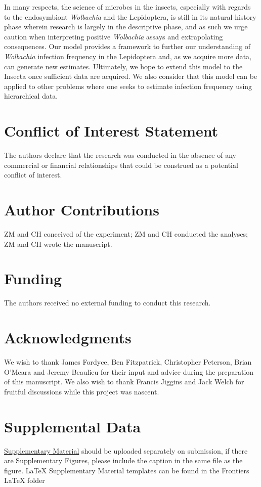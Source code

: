 \documentclass{frontiersSCNS}
\begin{document}
In many respects, the science of microbes in the insects, especially with regards to the endosymbiont \textit{Wolbachia} and the Lepidoptera, is still in its natural history phase wherein research is largely in the descriptive phase, and as such we urge caution when interpreting positive \textit{Wolbachia} assays and extrapolating consequences. Our model provides a framework to further our understanding of \textit{Wolbachia} infection frequency in the Lepidoptera and, as we acquire more data, can generate new estimates. Ultimately, we hope to extend this model to the Insecta once sufficient data are acquired. We also consider that this model can be applied to other problems where one seeks to estimate infection frequency using hierarchical data. 


\newpage

\section*{Conflict of Interest Statement}
The authors declare that the research was conducted in the absence of any commercial or financial relationships that could be construed as a potential conflict of interest.

\section*{Author Contributions}
ZM and CH conceived of the experiment; ZM and CH conducted the analyses; ZM and CH wrote the manuscript. 

\section*{Funding}
The authors received no external funding to conduct this research.

\section*{Acknowledgments}
We wish to thank James Fordyce, Ben Fitzpatrick, Christopher Peterson, Brian O'Meara and Jeremy Beaulieu for their input and advice during the preparation of this manuscript. We also wish to thank Francis Jiggins and Jack Welch for fruitful discussions while this project was nascent. 

\section*{Supplemental Data}
 \href{http://home.frontiersin.org/about/author-guidelines#SupplementaryMaterial}{Supplementary Material} should be uploaded separately on submission, if there are Supplementary Figures, please include the caption in the same file as the figure. LaTeX Supplementary Material templates can be found in the Frontiers LaTeX folder 
\newpage
 

\newpage 
\end{document}
